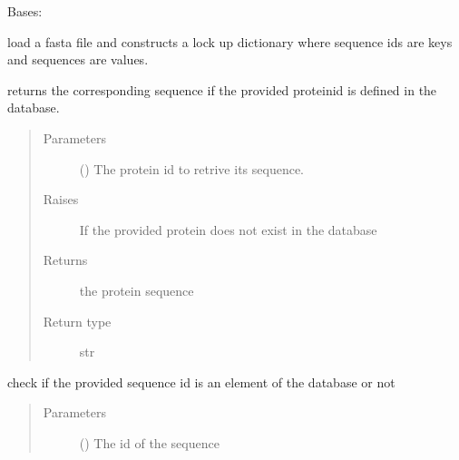 \documentclass[letterpaper,10pt,english]{sphinxmanual}
\begin{document}

\begin{fulllineitems}
\label{\detokenize{IPTK.Classes:IPTK.Classes.Database.SeqDB}}
Bases: 

load a fasta file and constructs a lock up dictionary where sequence ids are  keys and sequences are values.

\begin{fulllineitems}
\label{\detokenize{IPTK.Classes:IPTK.Classes.Database.SeqDB.get_seq}}
returns the corresponding sequence if the provided protein\sphinxhyphen{}id is defined in the database.
\begin{quote}\begin{description}
\item[{Parameters}] \leavevmode
{} () \textendash{} The protein id to retrive its sequence.

\item[{Raises}] \leavevmode
{} \textendash{} If the provided protein does not exist in the database

\item[{Returns}] \leavevmode
the protein sequence

\item[{Return type}] \leavevmode
str

\end{description}\end{quote}

\end{fulllineitems}


\begin{fulllineitems}
\label{\detokenize{IPTK.Classes:IPTK.Classes.Database.SeqDB.has_sequence}}
check if the provided sequence id is an element of the database or not
\begin{quote}\begin{description}
\item[{Parameters}] \leavevmode
{} () \textendash{} The id of the sequence


\end{description}
\end{quote}
\end{fulllineitems}
\end{fulllineitems}
\end{document}
